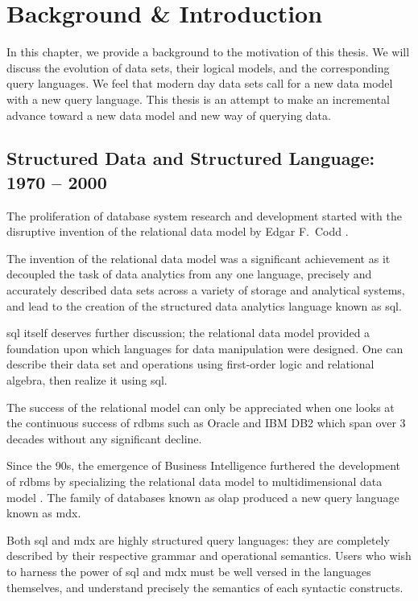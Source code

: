 \chapter{Background \& Introduction}
	In this chapter, we provide a background to the motivation of this thesis.  We will discuss the evolution of data sets, their logical models, and the corresponding query languages.  We feel that  modern day data sets call for a new data model with a new query language.  This thesis is an attempt to make an incremental advance toward a new data model and new way of querying data.

	\section{Structured Data and Structured Language:  1970 -- 2000}
		The proliferation of database system research and development started with the disruptive invention of the relational data model by Edgar F.~Codd \cite{codd-79}.
		
		The invention of the relational data model was a significant achievement as it decoupled the task of data analytics from any one language, precisely and accurately described data sets across a variety of storage and analytical systems, and lead to the creation of the structured data analytics language known as \gls{sql}.
		
		\gls{sql} itself deserves further discussion; the relational data model provided a foundation upon which languages for data manipulation were designed.  One can describe their data set and operations using first-order logic and relational algebra, then realize it using \gls{sql}.
		
		The success of the relational model can only be appreciated when one looks at the continuous success of \gls{rdbms} such as Oracle and IBM DB2 which span over 3 decades without any significant decline.
		
		Since the 90s, the emergence of Business Intelligence \cite{bikm-02} furthered the development of \gls{rdbms} by specializing the relational data model to multidimensional data model \cite{colliat-96}.  The family of databases known as \gls{olap} produced a new query language known as \gls{mdx}.
		
		Both \gls{sql} and \gls{mdx} are highly structured query languages: they are completely described by their respective grammar and operational semantics.  Users who wish to harness the power of \gls{sql} and \gls{mdx} must be well versed in the languages themselves, and understand precisely the semantics of each syntactic constructs.
		
